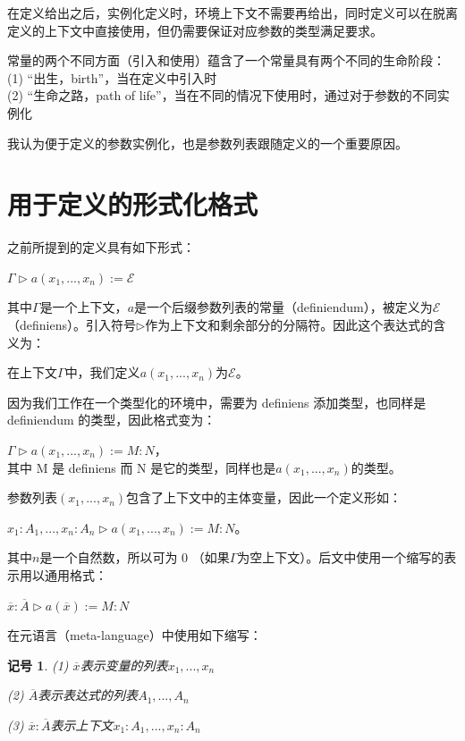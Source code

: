 \documentclass[UTF8]{article}
\newtheorem{notation}[thm]{记号}
\begin{document}
		在定义给出之后，实例化定义时，环境上下文不需要再给出，同时定义可以在脱离定义的上下文中直接使用，但仍需要保证对应参数的类型满足要求。
		
		常量的两个不同方面（引入和使用）蕴含了一个常量具有两个不同的生命阶段：\\
		(1) “出生，birth”，当在定义中引入时\\
		(2) “生命之路，path of life”，当在不同的情况下使用时，通过对于参数的不同实例化
		
		我认为便于定义的参数实例化，也是参数列表跟随定义的一个重要原因。
		
	\section{用于定义的形式化格式}
	\noindent
	之前所提到的定义具有如下形式：
	
		$\Gamma\triangleright a(x_1,...,x_n):=\mathcal{E}$
		
		其中$\Gamma$是一个上下文，$a$是一个后缀参数列表的常量（definiendum），被定义为$\mathcal{E}$（definiens）。引入符号$\triangleright$作为上下文和剩余部分的分隔符。因此这个表达式的含义为：
		
		在上下文$\Gamma$中，我们定义$a(x_1,...,x_n)$为$\mathcal{E}$。
		
		因为我们工作在一个类型化的环境中，需要为 definiens 添加类型，也同样是 definiendum 的类型，因此格式变为：
		
		$\Gamma\triangleright a(x_1,...,x_n):=M:N$，\\
		其中 M 是 definiens 而 N 是它的类型，同样也是$a(x_1,...,x_n)$的类型。
		
		参数列表$(x_1,...,x_n)$包含了上下文中的主体变量，因此一个定义形如：
		
		$x_1:A_1,...,x_n:A_n\triangleright a(x_1,...,x_n):=M:N$。
		
		其中$n$是一个自然数，所以可为 0 （如果$\Gamma$为空上下文）。后文中使用一个缩写的表示用以通用格式：
		
		$\overline{x}:\overline{A}\triangleright a(\overline{x}):=M:N$
		
		在元语言（meta-language）中使用如下缩写：
		
		\begin{notation}(1) $\overline{x}$表示变量的列表$x_1,...,x_n$
			
			(2) $\overline{A}$表示表达式的列表$A_1,...,A_n$
			
			(3) $\overline{x}:\overline{A}$表示上下文$x_1:A_1,...,x_n:A_n$
		\end{notation}
	
\end{document}
